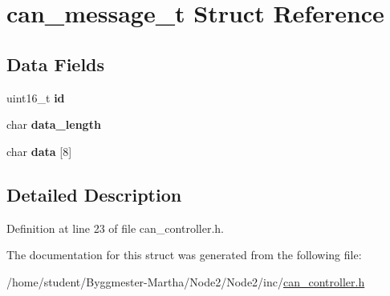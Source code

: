 \hypertarget{structcan__message__t}{}\section{can\+\_\+message\+\_\+t Struct Reference}
\label{structcan__message__t}
\subsection*{Data Fields}
\begin{DoxyCompactItemize}
\item 
\mbox{\label{structcan__message__t_ac5d7e171bc59d6e5ead8957faa1259a6}} 
uint16\+\_\+t {\bfseries id}
\item 
\mbox{\label{structcan__message__t_ab3769058723c86113dc6d4d7c8cf2ec0}} 
char {\bfseries data\+\_\+length}
\item 
\mbox{\label{structcan__message__t_a519019132ffdcd9fe783b12c4f280c57}} 
char {\bfseries data} \mbox{[}8\mbox{]}
\end{DoxyCompactItemize}


\subsection{Detailed Description}


Definition at line 23 of file can\+\_\+controller.\+h.



The documentation for this struct was generated from the following file\+:\begin{DoxyCompactItemize}
\item 
/home/student/\+Byggmester-\/\+Martha/\+Node2/\+Node2/inc/\hyperlink{can__controller_8h}{can\+\_\+controller.\+h}\end{DoxyCompactItemize}
